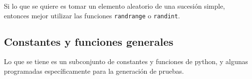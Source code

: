 \documentclass[12pt]{article}
\theoremstyle{definition}
\newtheorem{funcion}{}[section]
\begin{document}
Si lo que se quiere es tomar un elemento aleatorio de una sucesión simple, entonces mejor utilizar las funciones \verb|randrange| o \verb|randint|. 

\subsection{Constantes y funciones generales}
Lo que se tiene es un subconjunto de constantes y funciones de python, y algunas programadas específicamente para la generación de pruebas.

\end{document}

